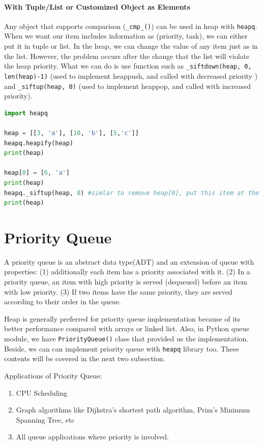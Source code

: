 \documentclass[main.tex]{subfiles}
\begin{document}
\paragraph{With Tuple/List or Customized Object as Elements}
Any object that supports comparison (\texttt{\_cmp\_()}) can be used in heap with \texttt{heapq}. When we want our item includes information as (priority, task), we can either put it in tuple or list. In the heap, we can change the value of any item just as in the list. However, the problem occurs after the change that the list will violate the heap priority. What we can do is use function such as \texttt{\_siftdown(heap, 0, len(heap)-1)} (used to implement heappush, and called with decreased priority ) and \texttt{\_siftup(heap, 0)} (used to implement heappop, and called with increased priority). 
\begin{lstlisting}[language=Python]
import heapq

heap = [[3, 'a'], [10, 'b'], [5,'c']]
heapq.heapify(heap)
print(heap)

heap[0] = [6, 'a']
print(heap)
heapq._siftup(heap, 0) #simlar to remove heap[0], put this item at the end
print(heap)
\end{lstlisting}

\section{Priority Queue}
\label{sec_priority_queue}
A priority queue is an abstract data type(ADT) and an extension of queue with properties: (1) additionally each item has a priority associated with it. (2) In a priority queue, an item with high priority is served (dequeued) before an item with low priority. (3) If two items have the same priority, they are served according to their order in the queue. 

Heap is generally preferred for priority queue implementation because of its better performance compared with arrays or linked list. Also, in Python queue module, we have \texttt{PriorityQueue()} class that provided us the implementation. Beside, we can can implement priority queue with  \texttt{heapq} library too. These contents will be covered in the next two subsection. 

Applications of Priority Queue:
\begin{enumerate}
    \item CPU Scheduling
    \item Graph algorithms like Dijkstra’s shortest path algorithm, Prim’s Minimum Spanning Tree, etc
    \item All queue applications where priority is involved. 
\end{enumerate}
\end{document}
